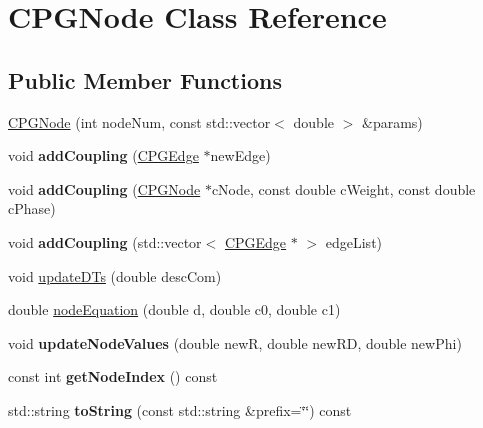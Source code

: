 \hypertarget{class_c_p_g_node}{\section{C\-P\-G\-Node Class Reference}
\label{class_c_p_g_node}
}
\subsection*{Public Member Functions}
\begin{DoxyCompactItemize}
\item 
\hyperlink{class_c_p_g_node_adf85adc940fc65c55661d2c54680761b}{C\-P\-G\-Node} (int node\-Num, const std\-::vector$<$ double $>$ \&params)
\item 
\hypertarget{class_c_p_g_node_abbc04ed9364d1d9582984eea1500a6b2}{void {\bfseries add\-Coupling} (\hyperlink{class_c_p_g_edge}{C\-P\-G\-Edge} $\ast$new\-Edge)}\label{class_c_p_g_node_abbc04ed9364d1d9582984eea1500a6b2}

\item 
\hypertarget{class_c_p_g_node_af920d93c523fc698fa39514949f52808}{void {\bfseries add\-Coupling} (\hyperlink{class_c_p_g_node}{C\-P\-G\-Node} $\ast$c\-Node, const double c\-Weight, const double c\-Phase)}\label{class_c_p_g_node_af920d93c523fc698fa39514949f52808}

\item 
\hypertarget{class_c_p_g_node_a793123808a719250aa64a0dbd0b14f4c}{void {\bfseries add\-Coupling} (std\-::vector$<$ \hyperlink{class_c_p_g_edge}{C\-P\-G\-Edge} $\ast$ $>$ edge\-List)}\label{class_c_p_g_node_a793123808a719250aa64a0dbd0b14f4c}

\item 
void \hyperlink{class_c_p_g_node_ad48c60bc4b025c3bb3aac740183ccac6}{update\-D\-Ts} (double desc\-Com)
\item 
double \hyperlink{class_c_p_g_node_aac8245887c945f5878c1a049246a07c9}{node\-Equation} (double d, double c0, double c1)
\item 
\hypertarget{class_c_p_g_node_a61f815e78e82f11cda8a271741897878}{void {\bfseries update\-Node\-Values} (double new\-R, double new\-R\-D, double new\-Phi)}\label{class_c_p_g_node_a61f815e78e82f11cda8a271741897878}

\item 
\hypertarget{class_c_p_g_node_a67734a086010a0ba34f51bf3c105118f}{const int {\bfseries get\-Node\-Index} () const }\label{class_c_p_g_node_a67734a086010a0ba34f51bf3c105118f}

\item 
\hypertarget{class_c_p_g_node_a8b869d8fd71f6f58158c7359a13cf26c}{std\-::string {\bfseries to\-String} (const std\-::string \&prefix=\char`\"{}\char`\"{}) const }\label{class_c_p_g_node_a8b869d8fd71f6f58158c7359a13cf26c}

\end{DoxyCompactItemize}
